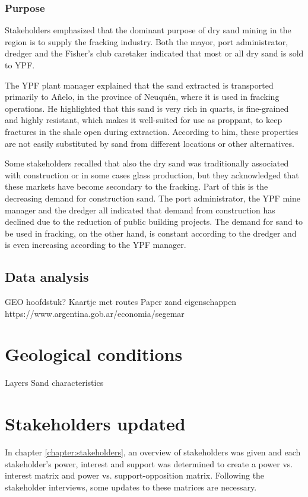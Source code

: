 \subsubsection{Purpose}
Stakeholders emphasized that the dominant purpose of dry sand mining in the region is to supply the fracking industry. Both the mayor, port administrator, dredger and the Fisher's club caretaker indicated that most or all dry sand is sold to YPF.

The YPF plant manager explained that the sand extracted is transported primarily to Añelo, in the province of Neuquén, where it is used in fracking operations. He highlighted that this sand is very rich in quarts, is fine-grained and highly resistant, which makes it well-suited for use as proppant, to keep fractures in the shale open during extraction. According to him, these properties are not easily substituted by sand from different locations or other alternatives.

Some stakeholders recalled that also the dry sand was traditionally associated with construction or in some cases glass production, but they acknowledged that these markets have become secondary to the fracking. Part of this is the decreasing demand for construction sand. The port administrator, the YPF mine manager and the dredger all indicated that demand from construction has declined due to the reduction of public building projects. The demand for sand to be used in fracking, on the other hand, is constant according to the dredger and is even increasing according to the YPF manager.

\subsection{Data analysis}
GEO hoofdstuk?
Kaartje met routes
Paper zand eigenschappen
https://www.argentina.gob.ar/economia/segemar

\section{Geological conditions}
Layers
Sand characteristics

\section{Stakeholders updated}
In chapter \ref{chapter:stakeholders}, an overview of stakeholders was given and each stakeholder's power, interest and support was determined to create a power vs. interest matrix and power vs. support-opposition matrix. Following the stakeholder interviews, some updates to these matrices are necessary.

